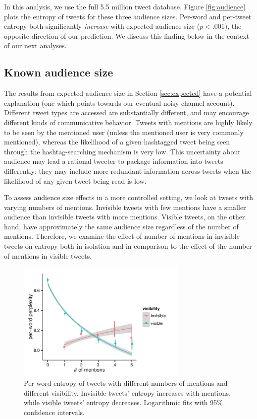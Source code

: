 \documentclass[11pt,letterpaper]{article}
\begin{document}
In this analysis, we use the full 5.5 million tweet database. Figure \ref{fig:audience} plots the entropy of tweets for these three audience sizes.  Per-word and per-tweet entropy both significantly {\it increase} with expected audience size ($p < .001$), the opposite direction of our prediction. We discuss this finding below in the context of our next analyses. 


\subsection{Known audience size}

The results from expected audience size in Section \ref{sec:expected} have a potential explanation (one which points towards our eventual noisy channel account). Different tweet types are accessed are substantially different, and may encourage different kinds of communicative behavior.  Tweets with mentions are highly likely to be seen by the mentioned user (unless the mentioned user is very commonly mentioned), whereas the likelihood of a given hashtagged tweet being seen through the hashtag-searching mechanism is very low.  This uncertainty about audience may lead a rational tweeter to package information into tweets differently: they may include more redundant information across tweets when the likelihood of any given tweet being read is low.

To assess audience size effects in a more controlled setting, we look at tweets with varying numbers of mentions.  Invisible tweets with few mentions have a smaller audience than invisible tweets with more mentions.  Visible tweets, on the other hand, have approximately the same audience size regardless of the number of mentions.  Therefore, we examine the effect of number of mentions in invisible tweets on entropy both in isolation and in comparison to the effect of the number of mentions in visible tweets.

\begin{figure}[t]
 \centering
  \includegraphics[width=3.25in]{figures/cmcl-mentions-pw2.pdf}
 \caption{Per-word entropy of tweets with different numbers of mentions and different visibility.  Invisible tweets' entropy increases with mentions, while visible tweets' entropy decreases.  Logarithmic fits with 95\% confidence intervals.}\label{fig:mentions}\vspace*{-.5em}
\end{figure}
\end{document}
